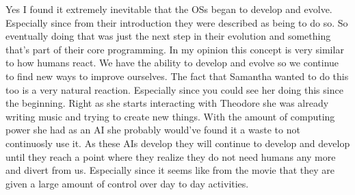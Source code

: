 \documentclass{article}
\begin{document}
Yes I found it extremely inevitable that the OSs began to develop and evolve.
Especially since from their introduction they were described as being to do so.
So eventually doing that was just the next step in their evolution and something
that's part of their core programming. In my opinion this concept is very
similar to how humans react. We have the ability to develop and evolve so we
continue to find new ways to improve ourselves. The fact that Samantha wanted to
do this too is a very natural reaction. Especially since you could see her doing
this since the beginning. Right as she starts interacting with Theodore she was
already writing music and trying to create new things. With the amount of
computing power she had as an AI she probably would've found it a waste to not
continuosly use it. As these AIs develop they will continue to develop and
develop until they reach a point where they realize they do not need humans any
more and divert from us. Especially since it seems like from the movie that they
are given a large amount of control over day to day activities. 
\end{document}
